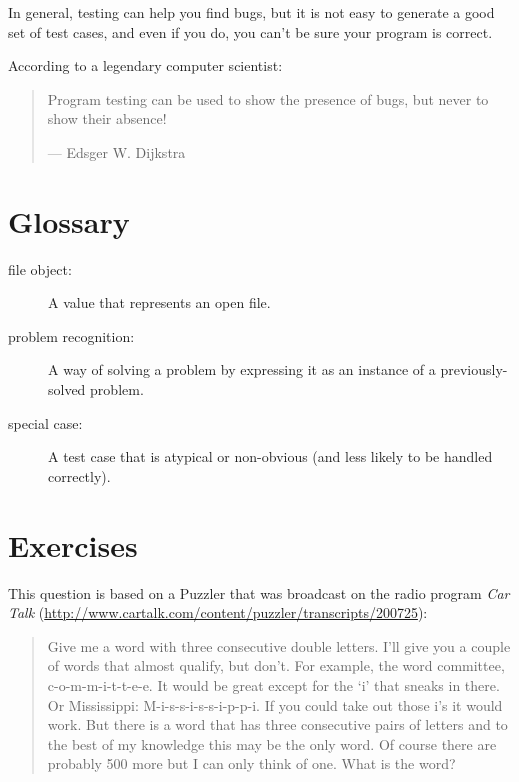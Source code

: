 \documentclass[10pt]{book}
\begin{document}
\begin{CJK}{UTF8}{gbsn}
In general, testing can help you find bugs, but it is not easy to
generate a good set of test cases, and even if you do, you can't
be sure your program is correct.

According to a legendary computer scientist:

\begin{quote}
Program testing can be used to show the presence of bugs, but never to
show their absence!

--- Edsger W. Dijkstra
\end{quote}


\section{Glossary}

\begin{description}

\item[file object:] A value that represents an open file.

\item[problem recognition:] A way of solving a problem by
expressing it as an instance of a previously-solved problem.

\item[special case:] A test case that is atypical or non-obvious
(and less likely to be handled correctly).

\end{description}


\section{Exercises}

\begin{exercise}

This question is based on a Puzzler that was broadcast on the radio
program {\em Car Talk} 
(\url{http://www.cartalk.com/content/puzzler/transcripts/200725}):

\begin{quote}
Give me a word with three consecutive double letters. I'll give you a
couple of words that almost qualify, but don't. For example, the word
committee, c-o-m-m-i-t-t-e-e. It would be great except for the `i' that
sneaks in there. Or Mississippi: M-i-s-s-i-s-s-i-p-p-i. If you could
take out those i's it would work. But there is a word that has three
consecutive pairs of letters and to the best of my knowledge this may
be the only word. Of course there are probably 500 more but I can only
think of one. What is the word?
\end{quote}


\end{exercise}
\end{CJK}
\end{document}
